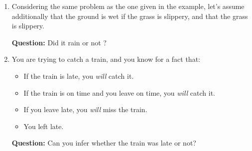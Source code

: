 \documentclass[11pt]{article}
\numberwithin{equation}{section}
\newcommand{\sol}[1]{
    }
\begin{document}
\begin{enumerate}
    \item Considering the same problem as the one given in the example, let's assume additionally that the ground is wet if the grass is slippery, and that the grass is slippery. 
    
    \textbf{Question:} Did it rain or not ?

    \sol{
        On top of knowing that the grass is slippery ($S$), we have a new rule: $S \implies W$.
        We thus know that the ground is wet as well: $W$.

        However, we cannot tell anything about the rain, as the grass being slippery or the ground being wet does not imply anything about the rain: $(S \land W) \centernot\implies R$. 
        We thus cannot say anything about the rain.
    }

    \item You are trying to catch a train, and you know for a fact that:
    \begin{itemize}
        \item If the train is late, you \emph{will} catch it.
        \item If the train is on time and you leave on time, you \emph{will} catch it.
        \item If you leave late, you \emph{will} miss the train.
        \item You left late.
    \end{itemize}
    \textbf{Question:} Can you infer whether the train was late or not?

    \sol{
        \paragraph{Notations}
        \begin{itemize}
            \item The train is on time: $T$.
            \item You left late: $L$.
            \item You catch the train: $C$.
        \end{itemize}

        \paragraph{Knowledge base}
        \begin{enumerate}
            \item If the train is late, you \emph{will} catch it: $\neg T \implies C$.
            \item If the train is on time and you leave on time, you \emph{will} catch it: $(T \land \neg L) \implies C$.
            \item If you leave late, you \emph{will} miss the train: $L \implies \neg C$.
            \item You left late: $L$.
        \end{enumerate}

}
\end{enumerate}
\end{document}
